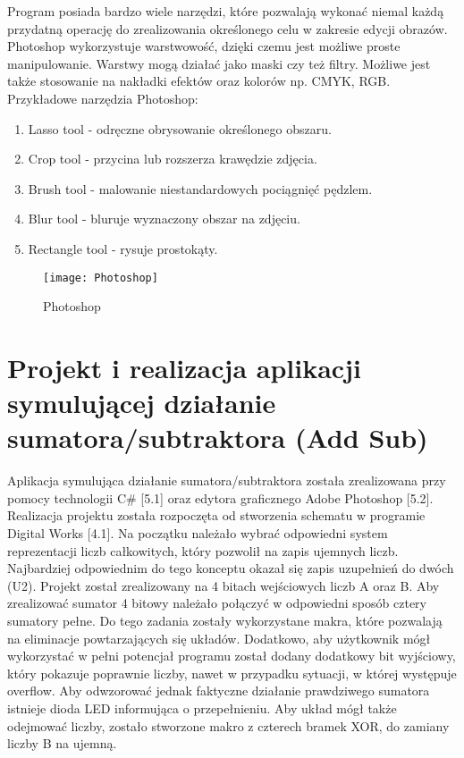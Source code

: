 \documentclass[12pt, a4paper, onside, polish]{article}				%
\begin{document}
Program posiada bardzo wiele narzędzi, które pozwalają wykonać niemal każdą przydatną operację do zrealizowania określonego celu w zakresie edycji obrazów. Photoshop wykorzystuje warstwowość, dzięki czemu jest możliwe proste manipulowanie. Warstwy mogą działać jako maski czy też filtry. Możliwe jest także stosowanie na nakładki efektów oraz kolorów np. CMYK, RGB.  
\newline\newline
Przykładowe narzędzia Photoshop:
 \begin{enumerate}
\item Lasso tool - odręczne obrysowanie określonego obszaru.
\item Crop tool - przycina lub rozszerza krawędzie zdjęcia.
\item Brush tool - malowanie niestandardowych pociągnięć pędzlem.
\item Blur tool - bluruje wyznaczony obszar na zdjęciu.
\item Rectangle tool - rysuje prostokąty. \newline
 \end{enumerate}
   	\begin{figure}[H]
  	  {\centering \texttt{[image: Photoshop]} \caption{Photoshop}}\vspace{5mm}
  	 \end{figure}
  	 
\cleardoublepage







\section{Projekt i realizacja aplikacji symulującej działanie sumatora/subtraktora (Add Sub)}
\hspace{\parindent}
Aplikacja symulująca działanie sumatora/subtraktora została zrealizowana przy pomocy technologii C\# [5.1] oraz edytora graficznego Adobe Photoshop [5.2]. Realizacja projektu została rozpoczęta od stworzenia schematu w programie Digital Works [4.1]. Na początku należało wybrać odpowiedni system reprezentacji liczb całkowitych, który pozwolił na zapis ujemnych liczb. Najbardziej odpowiednim do tego konceptu okazał się zapis uzupełnień do dwóch (U2). Projekt został zrealizowany na 4 bitach wejściowych liczb A oraz B. Aby zrealizować sumator 4 bitowy należało połączyć w odpowiedni sposób cztery sumatory pełne. Do tego zadania zostały wykorzystane makra, które pozwalają na eliminacje powtarzających się układów. Dodatkowo, aby użytkownik mógł wykorzystać w pełni potencjał programu został dodany dodatkowy bit wyjściowy, który pokazuje poprawnie liczby, nawet w przypadku sytuacji, w której występuje overflow. Aby odwzorować jednak faktyczne działanie prawdziwego sumatora istnieje dioda LED informująca o przepełnieniu. Aby układ mógł także odejmować liczby, zostało stworzone makro z czterech bramek XOR, do zamiany liczby B na ujemną. 
\end{document}
